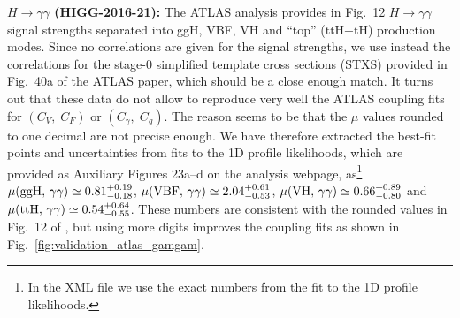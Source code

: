{\bf\boldmath $H\to\gamma\gamma$ (HIGG-2016-21):}  
The ATLAS analysis \cite{Aaboud:2018xdt} provides in Fig.~12 $H\to\gamma\gamma$ signal strengths separated into   
ggH, VBF, VH and ``top'' (ttH+tH) production modes. Since no correlations are given for the signal strengths, we 
use instead the correlations for the stage-0 simplified template cross sections (STXS) provided in Fig.~40a of the ATLAS 
paper, which should be a close enough match. It turns out that these data do not allow to reproduce very well the 
ATLAS coupling fits for $(C_V,\;C_F)$ or $(C_\gamma,\;C_g)$. The reason seems to be that the $\mu$ values 
rounded to one decimal are not  precise enough. We have therefore extracted the best-fit points and uncertainties 
from fits to the 1D profile likelihoods, which are provided as Auxiliary Figures 23a--d on the analysis webpage, as\footnote{In the XML file we use the exact numbers from the fit to the 1D profile likelihoods.}  
$\mu({\rm ggH},\,\gamma\gamma)\simeq 0.81^{+0.19}_{-0.18}$, 
$\mu({\rm VBF},\,\gamma\gamma)\simeq 2.04^{+0.61}_{-0.53}$, 
$\mu({\rm VH},\,\gamma\gamma)\simeq 0.66^{+0.89}_{-0.80}$ and 
$\mu({\rm ttH},\,\gamma\gamma)\simeq 0.54^{+0.64}_{-0.55}$.   
These numbers are consistent with the rounded values in Fig.~12 of \cite{Aaboud:2018xdt}, but using more digits 
improves the coupling fits as shown in Fig.~\ref{fig:validation_atlas_gamgam}. 

